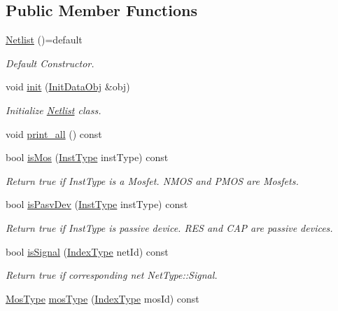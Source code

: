 \subsection*{Public Member Functions}
\begin{DoxyCompactItemize}
\item 
\hyperlink{classNetlist_a946b08b1adb8999f1cff352f5e9b588b}{Netlist} ()=default
\begin{DoxyCompactList}\small\item\em Default Constructor. \end{DoxyCompactList}\item 
void \hyperlink{classNetlist_ab61cbc31bee838b90f29c52aaae1e52a}{init} (\hyperlink{structNetlist_1_1InitDataObj}{Init\+Data\+Obj} \&obj)
\begin{DoxyCompactList}\small\item\em Initialize \hyperlink{classNetlist}{Netlist} class. \end{DoxyCompactList}\item 
void \hyperlink{classNetlist_ab4c7abc54d4524f5827a8609d7abd713}{print\+\_\+all} () const
\item 
bool \hyperlink{classNetlist_a3ea34258d9e7f6793736dcac5b927eb6}{is\+Mos} (\hyperlink{type_8h_a53644c687d6bc203d9d3d3ee70075f61}{Inst\+Type} inst\+Type) const
\begin{DoxyCompactList}\small\item\em Return true if Inst\+Type is a Mosfet. N\+M\+OS and P\+M\+OS are Mosfets. \end{DoxyCompactList}\item 
bool \hyperlink{classNetlist_acb347983cc7dcfb9d40c2affe8442cb2}{is\+Pasv\+Dev} (\hyperlink{type_8h_a53644c687d6bc203d9d3d3ee70075f61}{Inst\+Type} inst\+Type) const
\begin{DoxyCompactList}\small\item\em Return true if Inst\+Type is passive device. R\+ES and C\+AP are passive devices. \end{DoxyCompactList}\item 
bool \hyperlink{classNetlist_ae518e05727e5cc449d728b43426e035d}{is\+Signal} (\hyperlink{type_8h_a581e8093e28e7362f2b6937296190676}{Index\+Type} net\+Id) const
\begin{DoxyCompactList}\small\item\em Return true if corresponding net Net\+Type\+::\+Signal. \end{DoxyCompactList}\item 
\hyperlink{type_8h_a34a6a66323cfecf83dfe00bc8fd96333}{Mos\+Type} \hyperlink{classNetlist_a3dba84b8588a528e42b066083744958f}{mos\+Type} (\hyperlink{type_8h_a581e8093e28e7362f2b6937296190676}{Index\+Type} mos\+Id) const

\end{DoxyCompactItemize}
